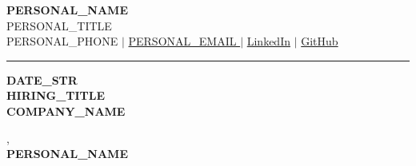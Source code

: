 \documentclass[11pt,a4paper]{article}
\begin{document}
\begin{center}
    {\Huge \bfseries \color{primary} {{ PERSONAL_NAME }}}\\[3pt]
    {\large \color{secondary} {{ PERSONAL_TITLE }}}\\[4pt]
    \small {{ PERSONAL_PHONE }} $|$ \href{mailto:{{ PERSONAL_EMAIL }}}{{{ PERSONAL_EMAIL }}} $|$ \href{{{ PERSONAL_LINKEDIN }}}{LinkedIn} $|$ \href{{{ PERSONAL_GITHUB }}}{GitHub}\\[2pt]
\end{center}

\vspace{10pt}
\hrule
\vspace{15pt}

\noindent \textbf{{{ DATE_STR }}}\\[10pt]
\noindent \textbf{{{ HIRING_TITLE }}}\\
\noindent \textbf{{{ COMPANY_NAME }}}\\[15pt]


\vspace{25pt}
,\\[20pt]
\noindent \textbf{{{ PERSONAL_NAME }}}\\
\end{document}
